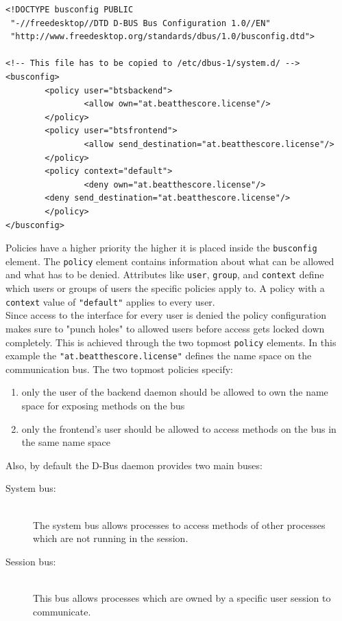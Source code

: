 \begin{lstlisting}
<!DOCTYPE busconfig PUBLIC
 "-//freedesktop//DTD D-BUS Bus Configuration 1.0//EN"
 "http://www.freedesktop.org/standards/dbus/1.0/busconfig.dtd">
 
<!-- This file has to be copied to /etc/dbus-1/system.d/ -->
<busconfig>
        <policy user="btsbackend">
                <allow own="at.beatthescore.license"/>
        </policy>
        <policy user="btsfrontend">
		        <allow send_destination="at.beatthescore.license"/>
        </policy>
        <policy context="default">
                <deny own="at.beatthescore.license"/>
        <deny send_destination="at.beatthescore.license"/>
        </policy>
</busconfig>
\end{lstlisting}

Policies have a higher priority the higher it is placed inside the {\tt busconfig} element. The {\tt policy} element contains information about what can be allowed and what has to be denied. Attributes like {\tt user}, {\tt group}, and {\tt context} define which users or groups of users the specific policies apply to. A policy with a {\tt context} value of {\tt "default"} applies to every user.
\\
Since access to the interface for every user is denied the policy configuration makes sure to "punch holes" to allowed users before access gets locked down completely. This is achieved through the two topmost {\tt policy} elements. In this example the {\tt "at.beatthescore.license"} defines the name space on the communication bus. The two topmost policies specify:
\begin{enumerate}
\item{only the user of the backend daemon should be allowed to own the name space for exposing methods on the bus}
\item{only the frontend's user should be allowed to access methods on the bus in the same name space}
\end{enumerate}

Also, by default the D-Bus daemon provides two main buses:
\begin{description}
\item[System bus:] \hfill \\ The system bus allows processes to access methods of other processes which are not running in the session.
\item[Session bus:] \hfill \\ This bus allows processes which are owned by a specific user session to communicate.
\end{description}

